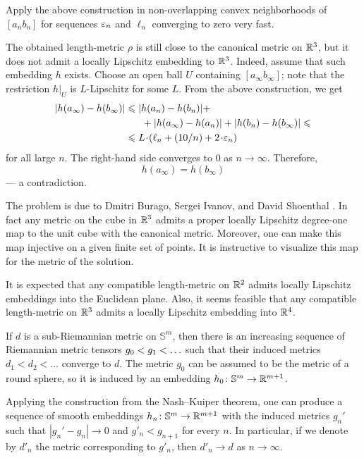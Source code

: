 Apply the above construction in non-overlapping convex neighborhoods of $[a_nb_n]$ for sequences $\varepsilon_n$ and $\ell_n$ converging to zero very fast.

The obtained length-metric $\rho$ is still close to the canonical metric on $\mathbb{R}^3$,
but it does not admit a locally Lipschitz embedding to $\mathbb{R}^3$.
Indeed, assume that such embedding $h$ exists.
Choose an open ball $U$ containing $[a_\infty b_\infty]$;
note that the restriction $h|_U$ is $L$-Lipschitz for some $L$.
From the above construction,
we get 
\begin{align*}
|h(a_\infty)-h(b_\infty)|
&\le 
|h(a_n)-h(b_n)|
+
\\
&\ \ \ \ \ +
|h(a_\infty)-h(a_n)|
+
|h(b_n)-h(b_\infty)|
\le
\\
&\le
L\cdot(\ell_n+\tfrac{10}n+2\cdot\eps_n)
\end{align*}
for all large $n$.
The right-hand side converges to $0$ as $n\to\infty$.
Therefore,
\[h(a_\infty)=h(b_\infty)\]
--- a contradiction.\qeds

The problem is due to
Dmitri Burago, 
Sergei Ivanov,
and David Shoenthal \cite{BIS}.
In fact any metric on the cube in $\mathbb{R}^3$ admits a proper locally Lipschitz degree-one map to the unit cube with the canonical metric.
Moreover, one can make this map injective on a given finite set of points.
It is instructive to visualize this map for the metric of the solution.

It is expected that any compatible length-metric on $\mathbb{R}^2$ admits locally Lipschitz embeddings into the Euclidean plane.
Also, it seems feasible that any compatible length-metric on $\mathbb{R}^3$ admits a locally Lipschitz embedding into $\mathbb{R}^4$.


If $d$ is a sub-Riemannian metric on $\mathbb{S}^m$,
then there is an increasing sequence of Riemannian metric tensors
$g_0\z< g_1<\ldots$ such that their induced metrics $d_1<d_2<\ldots$ converge to $d$.
The metric $g_0$ can be assumed to be the metric of a round sphere,
so it is induced by an embedding $h_0\colon\mathbb{S}^m\to \mathbb{R}^{m+1}$.

Applying the construction from the Nash--Kuiper theorem,
one can produce a sequence of smooth embeddings $h_n\colon\mathbb{S}^m\to \mathbb{R}^{m+1}$ with the induced metrics $g_n'$
such that $|g_n'-g_n|\to 0$ and $g'_n<g_{n+1}$ for every $n$.
In particular, if we denote by $d'_n$ the metric corresponding to $g'_n$, then $d'_n\to d$ as $n\to\infty$.

